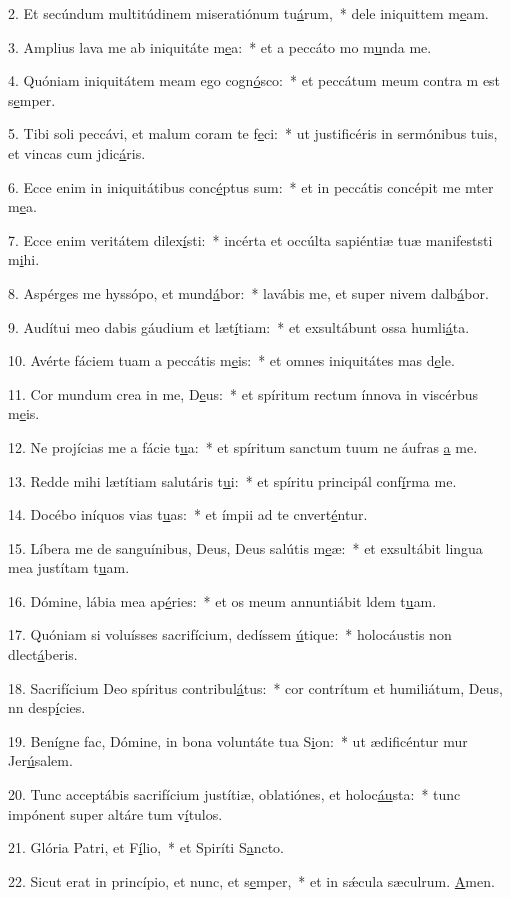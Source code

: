 2. Et secúndum multitúdinem miseratiónum tu\uline{á}rum,~* dele iniquittem m\uline{e}am.\par 
3. Amplius lava me ab iniquitáte m\uline{e}a:~* et a peccáto mo m\uline{u}nda me.\par 
4. Quóniam iniquitátem meam ego cogn\uline{ó}sco:~* et peccátum meum contra m est s\uline{e}mper.\par 
5. Tibi soli peccávi, et malum coram te f\uline{e}ci:~* ut justificéris in sermónibus tuis, et vincas cum jdic\uline{á}ris.\par 
6. Ecce enim in iniquitátibus conc\uline{é}ptus sum:~* et in peccátis concépit me mter m\uline{e}a.\par 
7. Ecce enim veritátem dilex\uline{í}sti:~* incérta et occúlta sapiéntiæ tuæ manifeststi m\uline{i}hi.\par 
8. Aspérges me hyssópo, et mund\uline{á}bor:~* lavábis me, et super nivem dalb\uline{á}bor.\par 
9. Audítui meo dabis gáudium et læt\uline{í}tiam:~* et exsultábunt ossa humli\uline{á}ta.\par 
10. Avérte fáciem tuam a peccátis m\uline{e}is:~* et omnes iniquitátes mas d\uline{e}le.\par 
11. Cor mundum crea in me, D\uline{e}us:~* et spíritum rectum ínnova in viscérbus m\uline{e}is.\par 
12. Ne projícias me a fácie t\uline{u}a:~* et spíritum sanctum tuum ne áufras \uline{a} me.\par 
13. Redde mihi lætítiam salutáris t\uline{u}i:~* et spíritu principál conf\uline{í}rma me.\par 
14. Docébo iníquos vias t\uline{u}as:~* et ímpii ad te cnvert\uline{é}ntur.\par 
15. Líbera me de sanguínibus, Deus, Deus salútis m\uline{e}æ:~* et exsultábit lingua mea justítam t\uline{u}am.\par 
16. Dómine, lábia mea ap\uline{é}ries:~* et os meum annuntiábit ldem t\uline{u}am.\par 
17. Quóniam si voluísses sacrifícium, dedíssem \uline{ú}tique:~* holocáustis non dlect\uline{á}beris.\par 
18. Sacrifícium Deo spíritus contribul\uline{á}tus:~* cor contrítum et humiliátum, Deus, nn desp\uline{í}cies.\par 
19. Benígne fac, Dómine, in bona voluntáte tua S\uline{i}on:~* ut ædificéntur mur Jer\uline{ú}salem.\par 
20. Tunc acceptábis sacrifícium justítiæ, oblatiónes, et holoc\uline{áu}sta:~* tunc impónent super altáre tum v\uline{í}tulos.\par 
21. Glória Patri, et F\uline{í}lio,~* et Spiríti S\uline{a}ncto.\par 
22. Sicut erat in princípio, et nunc, et s\uline{e}mper,~* et in sǽcula sæculrum. \uline{A}men.\par 
